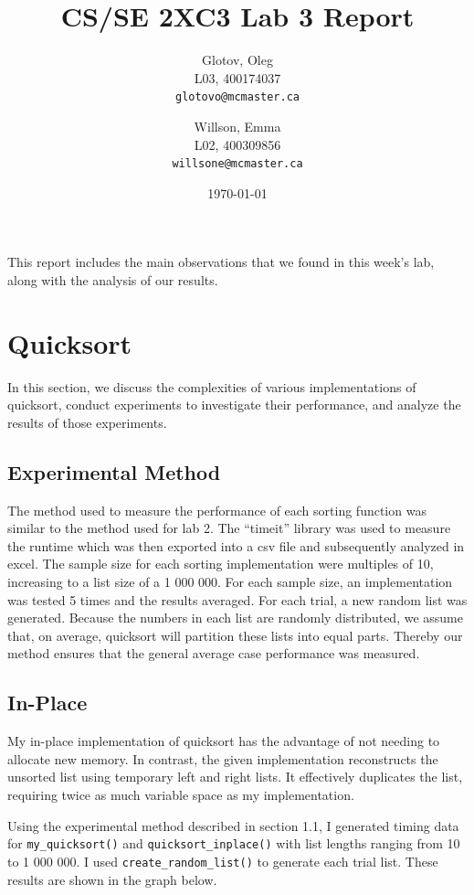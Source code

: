 \documentclass[12pt]{article}
\title{CS/SE 2XC3 Lab 3 Report}
\author{
  Glotov, Oleg\\ L03, 400174037\\
  \texttt{glotovo@mcmaster.ca}
  \and
  Willson, Emma\\ L02, 400309856\\
  \texttt{willsone@mcmaster.ca}
  }
\date{\today}
\begin{document}
\maketitle

This report includes the main observations that we found in this week's lab, along with the analysis of our results.

\newpage 
\section{Quicksort}
In this section, we discuss the complexities of various implementations of quicksort, conduct experiments to investigate their performance, and analyze the results of those experiments.
\subsection{Experimental Method}
The method used to measure the performance of each sorting function was similar to the method used for lab 2. The “timeit” library was used to measure the runtime which was then exported into a csv file and subsequently analyzed in excel. The sample size for each sorting implementation were multiples of 10, increasing to a list size of a 1 000 000. For each sample size, an implementation was tested 5 times and the results averaged. For each trial, a new random list was generated. Because the numbers in each list are randomly distributed, we assume that, on average, quicksort will partition these lists into equal parts. Thereby our method ensures that the general average case performance was measured.

\subsection{In-Place}
My in-place implementation of quicksort has the advantage of not needing to allocate new memory.  In contrast, the given implementation reconstructs the unsorted list using temporary left and right lists. It effectively duplicates the list, requiring twice as much variable space as my implementation. 

Using the experimental method described in section 1.1, I generated timing data for  \verb+my_quicksort()+ and \verb+quicksort_inplace()+ with list lengths ranging from 10 to 1 000 000. I used \verb+create_random_list()+ to generate each trial list. These results are shown in the graph below. 
\end{document}
